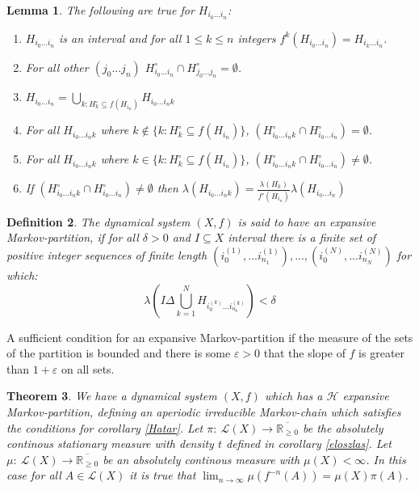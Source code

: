 \documentclass{article}
\newtheorem{theorem}{Theorem}[section]
\newtheorem{lemma}[theorem]{Lemma}
\newtheorem{defin}[theorem]{Definition}
\begin{document}
\begin{lemma} \label{Rendszer2}
The following are true for $H_{i_0...i_n}$:
\begin{enumerate}
\item $H_{i_0...i_n}$ is an interval and for all $1 \leq k\leq n$ integers $f^k(H_{i_0...i_n}) = H_{i_k...i_n}$.
\item For all other $(j_0...j_n)$ $H_{i_0...i_n}^\circ \cap H_{j_0...j_n}^\circ = \emptyset$.
\item $H_{i_0...i_n} = \bigcup_{k: H_k^\circ \subseteq f(H_{i_n})} H_{i_0...i_nk}$
\item For all $H_{i_0...i_nk}$ where $k \notin \{k:H_k^\circ \subseteq f(H_{i_n}) \}$, $( H_{i_0...i_nk}^\circ \cap H_{i_0...i_n}^\circ ) = \emptyset$.
\item For all $H_{i_0...i_nk}$ where $k \in \{k:H_k^\circ \subseteq f(H_{i_n}) \}$, $( H_{i_0...i_nk}^\circ \cap H_{i_0...i_n}^\circ ) \neq \emptyset$.
\item If $( H_{i_0...i_nk}^\circ \cap H_{i_0...i_n}^\circ ) \neq \emptyset$ then $\lambda(H_{i_0...i_nk}) = \frac{\lambda(H_{k})}{f'(H_{i_n})} \lambda(H_{i_0...i_n})$
\end{enumerate}
\end{lemma}

\begin{defin}
The dynamical system $(X,f)$ is said to have an expansive Markov-partition, if for all $\delta > 0$ and $I \subseteq X$ interval there is a finite set of positive integer sequences of finite length $(i^{(1)}_0,...i^{(1)}_{n_1}), ... , (i^{(N)}_0,...i^{(N)}_{n_N})$ for which: \[
\lambda( I \Delta \bigcup_{k=1}^N H_{i^{(k)}_0...i^{(k)}_{n_k}} ) < \delta
\]
\end{defin}

A sufficient condition for an expansive Markov-partition if the measure of the sets of the partition is bounded and there is some $\varepsilon > 0$ that the slope of $f$ is greater than $1+\varepsilon$ on all sets.

\begin{theorem} \label{nagyhatar}
We have a dynamical system $(X, f)$ which has a $\mathscr{H}$ expansive Markov-partition, defining an aperiodic irreducible Markov-chain which satisfies the conditions for corollary \ref{Hatar}. Let $\pi :\: \mathscr{L}(X) \rightarrow \overline{\mathbb{R}_{\geq 0}} $ be the absolutely continous stationary measure with density $t$ defined in corollary \ref{eloszlas}. Let $\mu:\: \mathscr{L}(X) \rightarrow \overline{\mathbb{R}_{\geq 0}}$ be an absolutely continous measure with $\mu(X) < \infty$. In this case for all $A \in \mathscr{L}(X)$ it is true that $\lim_{n\rightarrow \infty}\mu(f^{-n}(A)) =\mu(X)\pi(A)$.
\end{theorem} 
\end{document}
